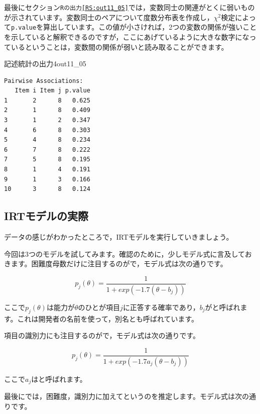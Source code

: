 \documentclass{ltjsbook}
\begin{document}
最後にセクション\texttt{Rの出力\ref{RS:out11_05}}では，変数同士の関連がとくに弱いものが示されています。変数同士のペアについて度数分布表を作成し，$\chi^2$検定によって\texttt{p.value}を算出しています。この値が小さければ，2つの変数の関係が強いことを示していると解釈できるのですが，ここにあげているように大きな数字になっているということは，変数間の関係が弱いと読み取ることができます。
\begin{Rscreen}{記述統計の出力4}{out11_05}
	\begin{verbatim}
Pairwise Associations:
   Item i Item j p.value
1       2      8   0.625
2       1      8   0.409
3       1      2   0.347
4       6      8   0.303
5       4      8   0.234
6       7      8   0.222
7       5      8   0.195
8       1      4   0.191
9       1      3   0.166
10      3      8   0.124
    \end{verbatim}
\end{Rscreen}
\subsection{IRTモデルの実際}
データの感じがわかったところで，IRTモデルを実行していきましょう。

今回は3つのモデルを試してみます。確認のために，少しモデル式に言及しておきます。困難度母数だけに注目するのがで，モデル式は次の通りです。

\[ p_j(\theta) = \frac{1}{1+exp(-1.7 (\theta -b_j))} \]

ここで$p_j(\theta)$は能力が$\theta$のひとが項目$j$に正答する確率であり，$b_j$がと呼ばれます。これは開発者の名前を使って，別名とも呼ばれています。

項目の識別力にも注目するのがで，モデル式は次の通りです。

\[ p_j(\theta) = \frac{1}{1+exp(-1.7 a_j(\theta -b_j))} \]

ここで$a_j$はと呼ばれます。

最後にでは，困難度，識別力に加えてというのを推定します。モデル式は次の通りです。
\end{document}
